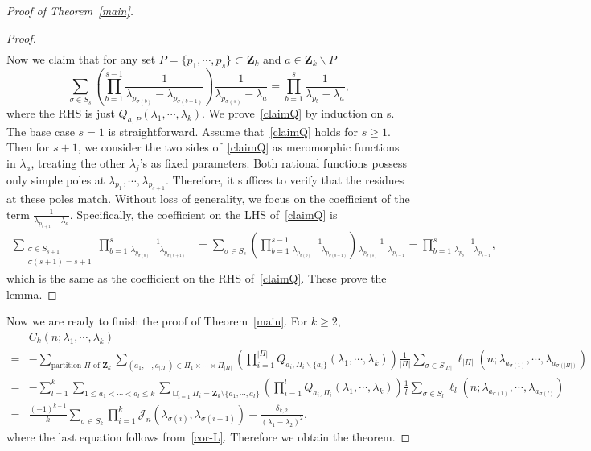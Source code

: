 \documentclass[a4paper]{article}
\theoremstyle{plain}
\theoremstyle{definition}
\newcommand{\nn}{\nonumber}
\begin{document}
\begin{proof}[Proof of Theorem~\ref{main}]
\begin{proof}
\begin{align}
	\end{align}
	Now we claim that for any set $P=\{p_{1},\cdots,p_{s}\}\subset\mathbf Z_k$ and $a\in\mathbf Z_k\backslash P$
	\begin{equation}
		\sum_{\sigma\in S_s}\left(\prod_{b=1}^{s-1}\frac{1}{\lambda_{p_{\sigma(b)}}-\lambda_{p_{\sigma(b+1)}}}\right)\frac{1}{\lambda_{p_{\sigma(s)}}-\lambda_{a}}=\prod_{b=1}^s\frac{1}{\lambda_{p_{b}}-\lambda_{a}},\label{claimQ}
	\end{equation}
	where the RHS is just $Q_{a,P}(\lambda_1,\cdots,\lambda_k)$. We prove~\eqref{claimQ} by induction on s. The base case $s=1$ is straightforward. Assume that~\eqref{claimQ} holds for $s\ge1$. Then for $s+1$, we consider the two sides of~\eqref{claimQ} as meromorphic functions in $\lambda_{a}$, treating the other $\lambda_{j}$'s as fixed parameters. Both rational functions possess only simple poles at $\lambda_{p_{1}},\cdots,\lambda_{p_{s+1}}$. Therefore, it suffices to verify that the residues at these poles match. Without loss of generality, we focus on the coefficient of the term $\frac{1}{\lambda_{p_{s+1}}-\lambda_{a}}$. Specifically, the coefficient on the LHS of~\eqref{claimQ} is
	\begin{align}
		\sum_{\substack{\sigma\in S_{s+1}\\\sigma(s+1)=s+1}}\prod_{b=1}^{s}\frac{1}{\lambda_{p_{\sigma(b)}}-\lambda_{p_{\sigma(b+1)}}}
		&=\sum_{\sigma\in S_s}\left(\prod_{b=1}^{s-1}\frac{1}{\lambda_{p_{\sigma(b)}}-\lambda_{p_{\sigma(b+1)}}}\right)\frac{1}{\lambda_{p_{\sigma(s)}}-\lambda_{p_{s+1}}}=\prod_{b=1}^s\frac{1}{\lambda_{p_b}-\lambda_{p_{s+1}}},
	\end{align}
	which is the same as the coefficient on the RHS of~\eqref{claimQ}. These prove the lemma.
\end{proof}

Now we are ready to finish the proof of Theorem~\ref{main}. For $k\ge2$,
	\begin{align}
		&C_{k}(n;\lambda_1,\cdots,\lambda_k)\nn\\
		=&-\sum_{\text{partition }\Pi\text{ of }\mathbf Z_k}\sum_{(a_1,\cdots,a_{|\Pi|})\in\Pi_1\times\cdots\times\Pi_{|\Pi|}} \left(\prod_{i=1}^{|\Pi|} Q_{a_i,\Pi_i\backslash\{a_i\}}(\lambda_1,\cdots,\lambda_k)\right)\frac{1}{|\Pi|}\sum_{\sigma\in S_{|\Pi|}} \ell_{|\Pi|}(n;\lambda_{a_{\sigma(1)}},\cdots,\lambda_{a_{\sigma(|\Pi|)}})\nn\\
		=&-\sum_{l=1}^k\sum_{1\le a_1<\cdots<a_l\le k} \sum_{\sqcup_{i=1}^l\Pi_i=\mathbf Z_k\setminus\{a_1,\cdots,a_l\}}\left(\prod_{i=1}^{l}Q_{a_i,\Pi_i}(\lambda_1,\cdots,\lambda_k)\right)\frac{1}{l}\sum_{\sigma\in S_l}\ell_l(n;\lambda_{a_{\sigma(1)}},\cdots,\lambda_{a_{\sigma(l)}})\nn\\
		=&\frac{(-1)^{k-1}}{k}\sum_{\sigma\in S_k}\prod_{i=1}^k\mathcal J_n(\lambda_{\sigma(i)},\lambda_{\sigma(i+1)})-\frac{\delta_{k,2}}{(\lambda_1-\lambda_2)^2},
	\end{align}
	where the last equation follows from~\eqref{cor-L}. Therefore we obtain the theorem.
\end{proof}	
\end{document}
